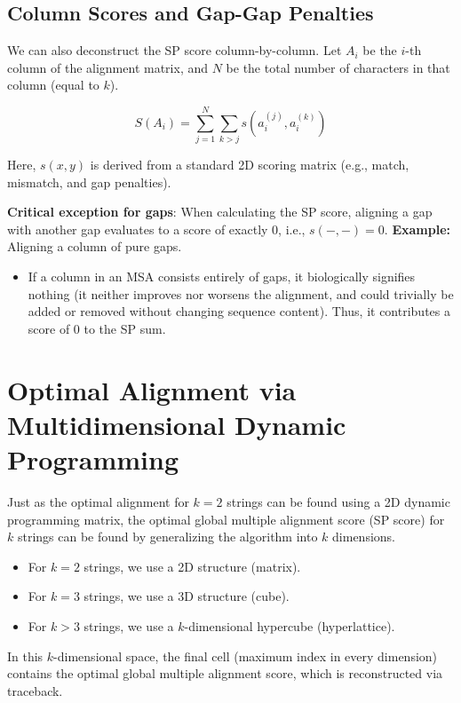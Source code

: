 \subsection{Column Scores and Gap-Gap Penalties}

We can also deconstruct the SP score column-by-column. Let $A_i$ be the $i$-th column of the alignment matrix, and $N$ be the total number of characters in that column (equal to $k$).

\[
S(A_i) = \sum_{j=1}^N \sum_{k>j} s(a_i^{(j)}, a_i^{(k)})
\]

Here, $s(x,y)$ is derived from a standard 2D scoring matrix (e.g., match, mismatch, and gap penalties).

\sta \textbf{Critical exception for gaps}: When calculating the SP score, aligning a gap with another gap evaluates to a score of exactly $0$, i.e., $s(-,-) = 0$.
\textbf{Example:} Aligning a column of pure gaps.
\begin{itemize}
    \item If a column in an MSA consists entirely of gaps, it biologically signifies nothing (it neither improves nor worsens the alignment, and could trivially be added or removed without changing sequence content). Thus, it contributes a score of 0 to the SP sum.
\end{itemize}

\section{Optimal Alignment via Multidimensional Dynamic Programming}

Just as the optimal alignment for $k=2$ strings can be found using a 2D dynamic programming matrix, the optimal global multiple alignment score (SP score) for $k$ strings can be found by generalizing the algorithm into $k$ dimensions.

\begin{itemize}
    \item For $k=2$ strings, we use a 2D structure (matrix).
    \item For $k=3$ strings, we use a 3D structure (cube).
    \item For $k>3$ strings, we use a $k$-dimensional hypercube (hyperlattice).
\end{itemize}

In this $k$-dimensional space, the final cell (maximum index in every dimension) contains the optimal global multiple alignment score, which is reconstructed via traceback.

